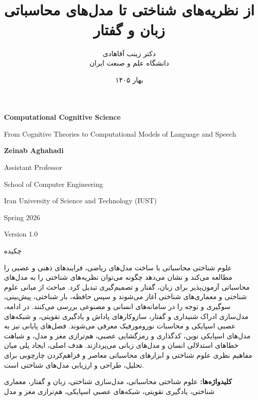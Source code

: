 \documentclass[12pt,a4paper]{book}
\title{{\titlefont\Huge \course}\\[0.5em]
{\Large از نظریه‌های شناختی تا مدل‌های محاسباتی زبان و گفتار}}
\author{دکتر زینب آقاهادی\\[0.4em]
دانشگاه علم و صنعت ایران}
\date{بهار ۱۴۰۵}
\begin{document}
\raggedbottom
\frontmatter
\maketitle

\begingroup
\thispagestyle{empty}
\begin{latin}
\centering
\vspace*{0.16\textheight}
{\Huge\bfseries Computational Cognitive Science\par}
\vspace{3em}
{\Large From Cognitive Theories to Computational Models of Language and Speech\par}
\vfill
{\Large\bfseries Zeinab Aghahadi\par}
\vspace{1.2em}
{\large Assistant Professor\par}
{\large School of Computer Engineering\par}
{\large Iran University of Science and Technology (IUST)\par}
\vfill
{\large Spring 2026\par}
\vspace{0.5em}
{\large Version 1.0\par}
\end{latin}
\clearpage
\endgroup

\begingroup
\thispagestyle{empty}
{\titlefont\LARGE چکیده\par}
\vspace{1.5em}
علوم شناختی محاسباتی با ساخت مدل‌های ریاضی، فرایندهای ذهنی و عصبی را مطالعه می‌کند و نشان می‌دهد چگونه می‌توان نظریه‌های شناختی را به مدل‌های محاسباتی آزمون‌پذیر برای زبان، گفتار و تصمیم‌گیری تبدیل کرد. مباحث از مبانی علوم شناختی و معماری‌های شناختی آغاز می‌شوند و سپس حافظه، بار شناختی، پیش‌بینی، سوگیری و توجه را در سامانه‌های انسانی و مصنوعی بررسی می‌کنند. در ادامه، مدل‌سازی ادراک شنیداری و گفتار، سازوکارهای پاداش و یادگیری تقویتی، و شبکه‌های عصبی اسپایکی و محاسبات نورومورفیک معرفی می‌شوند. فصل‌های پایانی نیز به مدل‌های اسپایکی نوین، کدگذاری و رمزگشایی عصبی، هم‌ترازی مغز و مدل، و شباهت خطاهای استدلالی انسان و مدل‌های زبانی می‌پردازند. هدف اصلی، ایجاد پلی میان مفاهیم نظری علوم شناختی و ابزارهای محاسباتی معاصر و فراهم‌کردن چارچوبی برای تحلیل، طراحی و ارزیابی مدل‌های شناختی است.

\vfill
\textbf{کلیدواژه‌ها:} علوم شناختی محاسباتی، مدل‌سازی شناختی، زبان و گفتار، معماری شناختی، یادگیری تقویتی، شبکه‌های عصبی اسپایکی، هم‌ترازی مغز و مدل
\clearpage
\endgroup
\end{document}
